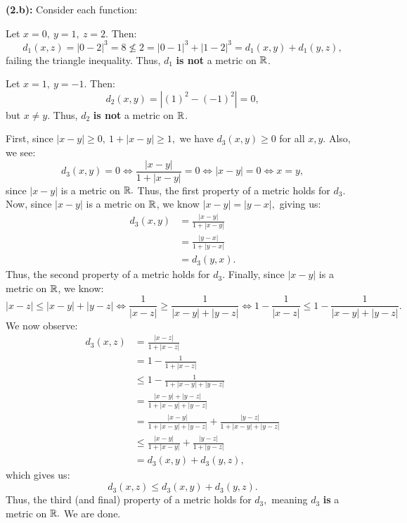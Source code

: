\documentclass[11pt,letterpaper]{article}
\begin{document}
\textbf{(2.b):} Consider each function:
    \item Let $x=0,\: y=1,\: z=2.$ Then:
        \[
            d_1(x,z) = |0-2|^3 = 8 \not\leq 2 = |0-1|^3 + |1-2|^3 = d_1(x,y) + d_1(y,z),
        \] failing the triangle inequality.
        Thus, $d_1$ \textbf{is not} a metric on $\mathbb{R}$.
    \item Let $x=1,\: y=-1.$ Then:
        \[
            d_2(x,y) = |(1)^2 - (-1)^2| = 0,
        \] but $x\neq y.$
        Thus, $d_2$ \textbf{is not} a metric on $\mathbb{R}$.
    \item First, since $|x-y|\geq 0,\: 1 + |x-y|\geq 1,$ we have $d_3(x,y)\geq 0$ for all $x,y.$
        Also, we see:
        \[
            d_3(x,y) = 0 \Longleftrightarrow 
            \frac{|x-y|}{1 + |x-y|} = 0 \Longleftrightarrow
            |x-y| = 0\Longleftrightarrow
            x = y,
        \] since $|x-y|$ is a metric on $\mathbb{R}.$ 
        Thus, the first property of a metric holds for $d_3.$
        Now, since $|x-y|$ is a metric on $\mathbb{R}$, we know $|x-y|=|y-x|,$ giving us:
        \begin{align*}
            d_3(x,y) 
                &= \frac{|x-y|}{1 + |x-y|}\\
                &= \frac{|y-x|}{1 + |y-x|}\\
                &= d_3(y,x).
        \end{align*}
        Thus, the second property of a metric holds for $d_3.$
        Finally, since $|x-y|$ is a metric on $\mathbb{R}$, we know:
            \[
                |x-z|\leq |x-y| + |y-z| 
                    \Longleftrightarrow 
                        \frac{1}{|x-z|}\geq \frac{1}{|x-y| + |y-z|}
                    \Longleftrightarrow 
                        1 - \frac{1}{|x-z|}\leq 1 - \frac{1}{|x-y| + |y-z|}.
            \]
        We now observe:
        \begin{align*}
            d_3(x,z)
                &= \frac{|x-z|}{1 + |x-z|}\\
                &= 1 - \frac{1}{1 + |x-z|}\\
                &\leq 1 - \frac{1}{1 + |x-y| + |y-z|}\\
                &= \frac{|x-y| + |y-z|}{1 + |x-y| + |y-z|}\\
                &= \frac{|x-y|}{1 + |x-y| + |y-z|} + \frac{|y-z|}{1 + |x-y| + |y-z|}\\
                &\leq \frac{|x-y|}{1 + |x-y|} + \frac{|y-z|}{1 + |y-z|}\\
                &= d_3(x,y) + d_3(y,z),
        \end{align*}
        which gives us:
        \[
            d_3(x,z) \leq d_3(x,y) + d_3(y,z).
        \]
        Thus, the third (and final) property of a metric holds for $d_3,$
        meaning $d_3$ \textbf{is} a metric on $\mathbb{R}.$
\denumi
We are done.\\
\rightline{$\square$}
\end{document}
